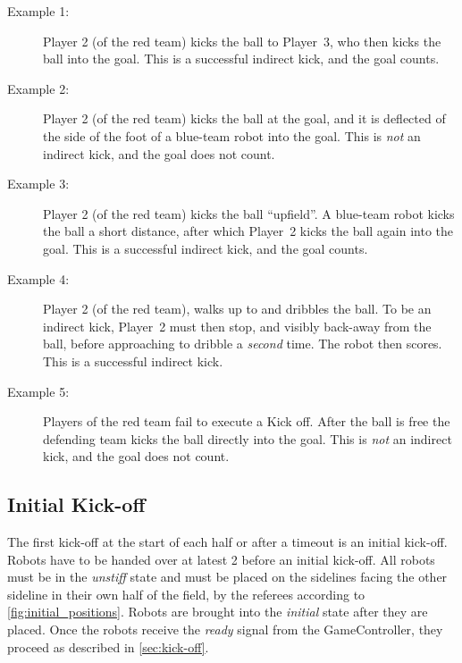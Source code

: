 \begin{description}
  \item[Example 1:] Player 2 (of the red team) kicks the ball to Player~3, who then kicks the ball into the goal. This is a successful indirect kick, and the goal counts.
  \item[Example 2:] Player 2 (of the red team) kicks the ball at the goal, and it is deflected of the side of the foot of a blue-team robot into the goal. This is \textit{not} an indirect kick, and the goal does not count.
  \item[Example 3:] Player 2 (of the red team) kicks the ball ``upfield''. A blue-team robot kicks the ball a short distance, after which Player~2 kicks the ball again into the goal. This is a successful indirect kick, and the goal counts.
  \item[Example 4:] Player 2 (of the red team), walks up to and dribbles the ball. To be an indirect kick, Player~2 must then stop, and visibly back-away from the ball, before approaching to dribble a \textit{second} time. The robot then scores. This is a successful indirect kick.
  \item[Example 5:] Players of the red team fail to execute a Kick off. After the ball is free the defending team kicks the ball directly into the goal. This is \textit{not} an indirect kick, and the goal does not count.
\end{description}

\subsection{Initial Kick-off}
\label{sec:initial-kick-off}

The first kick-off at the start of each half or after a timeout is an initial kick-off.
Robots have to be handed over at latest \qty{2}{\min} before an initial kick-off. All robots must be in the \textit{unstiff} state and must be placed on the sidelines facing the other sideline in their own half of the field, by the referees according to \cref{fig:initial_positions}. Robots are brought into the \textit{initial} state after they are placed. Once the robots receive the \emph{ready} signal from the GameController, they proceed as described in \cref{sec:kick-off}.

